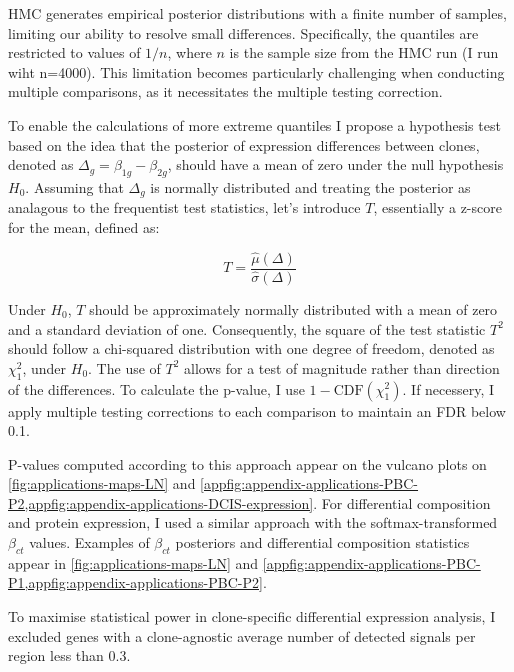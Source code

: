 \ac{HMC} generates empirical posterior distributions with a finite number of samples, limiting our ability to resolve small differences. Specifically, the quantiles are restricted to values of $1/n$, where $n$ is the sample size from the \ac{HMC} run (I run wiht n=4000). This limitation becomes particularly challenging when conducting multiple comparisons, as it necessitates the multiple testing correction. 

To enable the calculations of more extreme quantiles I propose a hypothesis test based on the idea that the posterior of expression differences between clones, denoted as $\Delta_g = \beta_{1g} - \beta_{2g}$, should have a mean of zero under the null hypothesis $H_0$. Assuming that $\Delta_g$ is normally distributed and treating the posterior as analagous to the frequentist test statistics, let's introduce $T$, essentially a z-score for the mean, defined as:

\begin{equation}
    T = \frac{\hat{\mu}(\Delta)}{\hat{\sigma}(\Delta)}
\end{equation}


Under $H_0$, $T$ should be approximately normally distributed with a mean of zero and a standard deviation of one. Consequently, the square of the test statistic $T^2$ should follow a chi-squared distribution with one degree of freedom, denoted as $\chi^2_1$, under $H_0$. The use of $T^2$ allows for a test of magnitude rather than direction of the differences. To calculate the p-value, I use $1 - \text{CDF}(\chi^2_1)$. If necessery, I apply multiple testing corrections to each comparison to maintain an \acs{FDR} below 0.1.

P-values computed according to this approach appear on the vulcano plots on \cref{fig:applications-maps-LN} and \cref{appfig:appendix-applications-PBC-P2,appfig:appendix-applications-DCIS-expression}. For differential composition and protein expression, I used a similar approach with the softmax-transformed $\beta_{ct}$ values. Examples of $\beta_{ct}$ posteriors and differential composition statistics appear in \cref{fig:applications-maps-LN} and \cref{appfig:appendix-applications-PBC-P1,appfig:appendix-applications-PBC-P2}. 

To maximise statistical power in clone-specific differential expression analysis, I excluded genes with a clone-agnostic average number of detected signals per region less than 0.3.

